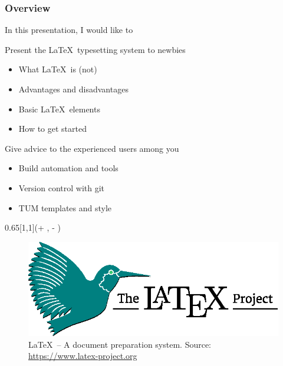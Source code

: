 \documentclass{tum-presentation}
\title{\mytitle}
\author{\Person}
\institute[]{\UniversitaetName \\ \FakultaetName \\ \LehrstuhlName}
\date{München, November 15, 2016}
\begin{document}
\PraesentationMasterKopfzeileDreizeiler

\PraesentationTitelseite

\begin{frame}
  \frametitle{Overview}

  In this presentation, I would like to
  \begin{PraesentationAufzaehlung}
  \item Present the \LaTeX~typesetting system to newbies
    \begin{itemize}
    \item What \LaTeX~is (not)
    \item Advantages and disadvantages
    \item Basic \LaTeX~elements
    \item How to get started
    \end{itemize}
  \item Give advice to the experienced users among you
    \begin{itemize}
    \item Build automation and tools
    \item Version control with git
    \item TUM templates and style
    \end{itemize}
  \end{PraesentationAufzaehlung}

  \begin{textblock*}{0.65\paperwidth}[1,1](\textwidth + \PraesentationSeitenrand, \textheight - \PraesentationSeitenrand)%
    \begin{figure}
      \includegraphics[width=0.6\paperwidth]{figures/latex-project-logo}
      \caption{\LaTeX~-- A document preparation system. Source: \url{https://www.latex-project.org}}
    \end{figure}
  \end{textblock*}
\end{frame}
\end{document}

